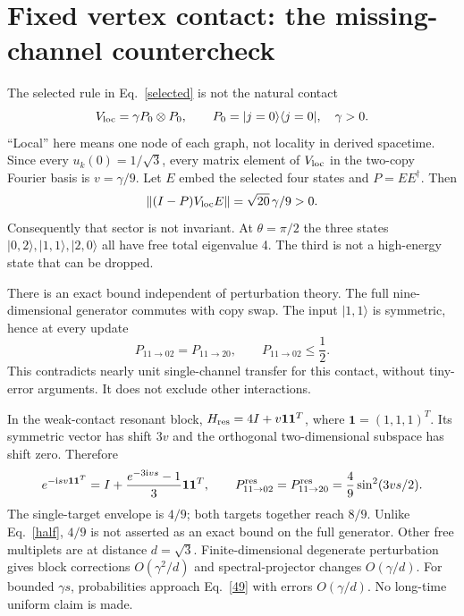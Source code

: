 \documentclass[11pt,a4paper]{article}
\newcommand{\ii}{\mathrm i}
\newcommand{\ket}[1]{|#1\rangle}
\newcommand{\bra}[1]{\langle#1|}
\begin{document}
\section{Fixed vertex contact: the missing-channel countercheck}
The selected rule in Eq.~\eqref{selected} is not the natural contact
\begin{equation}
 V_{\rm loc}=\gamma P_0\otimes P_0,\qquad
 P_0=\ket{j=0}\bra{j=0},\quad\gamma>0.\label{contact}
\end{equation}
``Local'' here means one node of each graph, not locality in derived
spacetime. Since every $u_k(0)=1/\sqrt3$, every matrix element of
$V_{\rm loc}$ in the two-copy Fourier basis is $v=\gamma/9$.
Let $E$ embed the selected four states and $P=EE^\dagger$. Then
\begin{equation}
 \|(I-P)V_{\rm loc}E\|=\sqrt{20}\,\gamma/9>0.
\end{equation}
Consequently that sector is not invariant. At $\theta=\pi/2$ the
three states $\ket{0,2},\ket{1,1},\ket{2,0}$ all have free total
eigenvalue 4. The third is not a high-energy state that can be dropped.

There is an exact bound independent of perturbation theory. The full
nine-dimensional generator commutes with copy swap. The input
$\ket{1,1}$ is symmetric, hence at every update
\begin{equation}
 P_{11\to02}=P_{11\to20},\qquad P_{11\to02}\leq\frac12.\label{half}
\end{equation}
This contradicts nearly unit single-channel transfer for this contact,
without tiny-error arguments. It does not exclude other interactions.

In the weak-contact resonant block, $H_{\rm res}=4I+v\mathbf1\mathbf1^T$,
where $\mathbf1=(1,1,1)^T$. Its symmetric vector has shift $3v$ and the
orthogonal two-dimensional subspace has shift zero. Therefore
\begin{equation}
 e^{-\ii s v\mathbf1\mathbf1^T}
 =I+\frac{e^{-3\ii vs}-1}{3}\mathbf1\mathbf1^T,
 \qquad P_{11\to02}^{\rm res}=P_{11\to20}^{\rm res}
 =\frac49\sin^2(3vs/2).\label{49}
\end{equation}
The single-target envelope is $4/9$; both targets together reach $8/9$.
Unlike Eq.~\eqref{half}, $4/9$ is not asserted as an exact bound on the
full generator. Other free multiplets are at distance $d=\sqrt3$.
Finite-dimensional degenerate perturbation gives block corrections
$O(\gamma^2/d)$ and spectral-projector changes $O(\gamma/d)$.
For bounded $\gamma s$, probabilities approach Eq.~\eqref{49} with
errors $O(\gamma/d)$. No long-time uniform claim is made.
\end{document}
